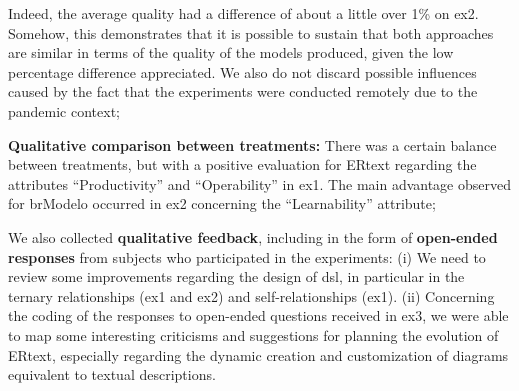 \begin{description}
    Indeed, the average quality had a difference of about a little over 1\% on \ac{ex2}.
    Somehow, this demonstrates that it is possible to sustain that both approaches are similar in terms of the quality of the models produced, given the low percentage difference appreciated.
    We also do not discard possible influences caused by the fact that the experiments were conducted remotely due to the pandemic context;
    
    \item \textbf{Qualitative comparison between treatments:} There was a certain balance between treatments, but with a positive evaluation for ERtext regarding the attributes ``Productivity'' and ``Operability'' in \ac{ex1}.
    The main advantage observed for brModelo occurred in \ac{ex2} concerning the ``Learnability'' attribute;
    
    \item We also collected \textbf{qualitative feedback}, including in the form of \textbf{open-ended responses} from subjects who participated in the experiments:
    (i) We need to review some improvements regarding the design of \ac{dsl}, in particular in the ternary relationships (\ac{ex1} and \ac{ex2}) and self-relationships (\ac{ex1}).
    (ii) Concerning the coding of the responses to open-ended questions received in \ac{ex3}, we were able to map some interesting criticisms and suggestions for planning the evolution of ERtext, especially regarding the dynamic creation and customization of diagrams equivalent to textual descriptions.
\end{description}

